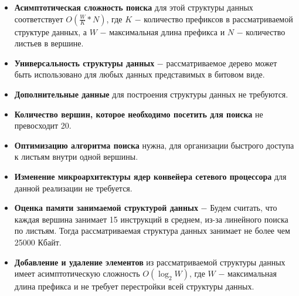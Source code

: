 \documentclass[a4paper, 12pt, titlepage, finall]{extreport}
\begin{document}
            \begin{itemize}
                \item\textbf{Асимптотическая сложность поиска} для этой структуры данных соответствует {\ttfamily $O(\frac{W}{K}*N)$},
                где {\ttfamily $K$} $-$ количество префиксов в рассматриваемой структуре данных, а {\ttfamily $W$} $-$ максимальная длина префикса
                и {\ttfamily $N$} $-$ количество листьев в вершине.
                \item\textbf{Универсальность структуры данных} $-$ рассматриваемое дерево может быть использовано для любых данных представимых в битовом виде.
                \item\textbf{Дополнительные данные} для построения структуры данных не требуются.
                \item\textbf{Количество вершин, которое необходимо посетить для поиска} не превосходит 20. 
                \item\textbf{Оптимизацию алгоритма поиска} нужна, для организации быстрого доступа к листьям внутри одной вершины. 
                \item\textbf{Изменение микроархитектуры ядер конвейера сетевого процессора} для данной реализации не требуется.
                \item\textbf{Оценка памяти занимаемой структурой данных} $-$ Будем считать, что каждая вершина занимает 15 инструкций в среднем, из-за линейного поиска по листьям. 
                Тогда рассматриваемая структура данных занимает не более чем 25000 Кбайт.
                \item\textbf{Добавление и удаление элементов} из рассматриваемой структуры данных имеет асимптотическую сложность 
                {\ttfamily $O(\log_2{W})$}, где {\ttfamily $W$} $-$ максимальная длина префикса и не требует перестройки всей структуры данных.\\
            \end{itemize}
\end{document}
